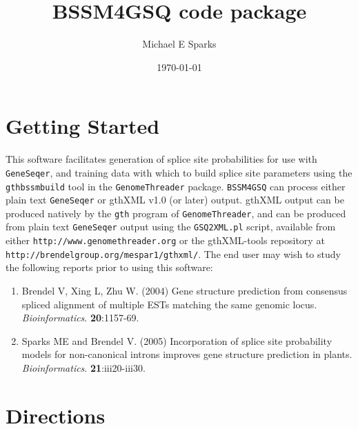 \documentclass[11pt]{article}
\begin{document}

\title{BSSM4GSQ code package}
\author{Michael E Sparks}
\date{\today}
\maketitle

\section{Getting Started}
This software facilitates generation of splice site probabilities for
use with \texttt{GeneSeqer}, and training data with which to
build splice site parameters using the \texttt{gthbssmbuild}
tool in the \texttt{GenomeThreader} package.
\texttt{BSSM4GSQ} can process either plain text \texttt{GeneSeqer}
or gthXML v1.0 (or later) output.
gthXML output can be produced natively by the \texttt{gth}
program of \texttt{GenomeThreader}, and can be produced from plain text
\texttt{GeneSeqer} output using the \texttt{GSQ2XML.pl} script,
available from either \break
\texttt{http://www.genomethreader.org} or the gthXML-tools repository at \break
\texttt{http://brendelgroup.org/mespar1/gthxml/}.
The end user may wish to study the following reports prior to
using this software:
\begin{enumerate} 
  \item
  Brendel V, Xing L, Zhu W. (2004) Gene structure prediction from consensus
  spliced alignment of multiple ESTs matching the same genomic locus.
  \emph{Bioinformatics}. \textbf{20}:1157-69.
  \item
  Sparks ME and Brendel V. (2005) Incorporation of splice site probability models
  for non-canonical introns improves gene structure prediction in plants.
  \emph{Bioinformatics}. \textbf{21}:iii20-iii30.
\end{enumerate}

\section{Directions}
\end{document}
